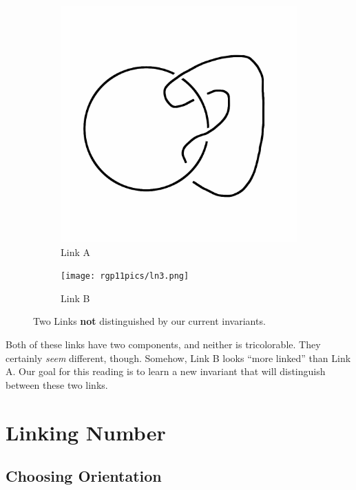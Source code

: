 \documentclass[12pt,letterpaper]{article}
\theoremstyle{definition}
\begin{document}
\begin{figure}[h]
    \centering
    \begin{subfigure}{.3\textwidth}
        \centering
        \includegraphics[width=\textwidth]{rgp11pics/lno2.png}
        \caption{Link A}
    \end{subfigure}
    \hspace{1cm}
    \begin{subfigure}{.3\textwidth}
        \centering         
        \texttt{[image: rgp11pics/ln3.png]}
        \caption{Link B}
    \end{subfigure}
    \caption{Two Links \textbf{not} distinguished by our current invariants.}
\end{figure}


Both of these links have two components, and neither is tricolorable.
They certainly \emph{seem} different, though.
Somehow, Link B looks ``more linked'' than Link A.
Our goal for this reading is to learn a new invariant that will distinguish between these two links.

\section*{Linking Number}

\subsection*{Choosing Orientation}
\end{document}
